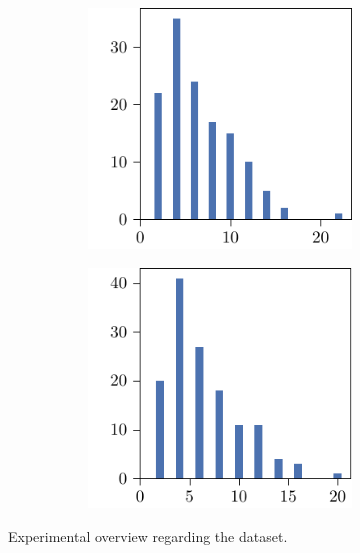 \begin{figure}[p]
\begin{subfigure}{\textwidth}
\begin{subfigure}{\mymultiouter}
          \includegraphics[width=\mymultiinner]{figures/new/manhattan-diabetes-qlibra-retraining}
    \end{subfigure}
    \begin{subfigure}{\mymultiouter}
        \centering
          \includegraphics[width=\mymultiinner]{figures/new/manhattan-diabetes-permutation-retraining}
      \end{subfigure}
  \end{subfigure}
    \caption{Experimental overview regarding the \diabetes{} dataset.}
\end{figure}


